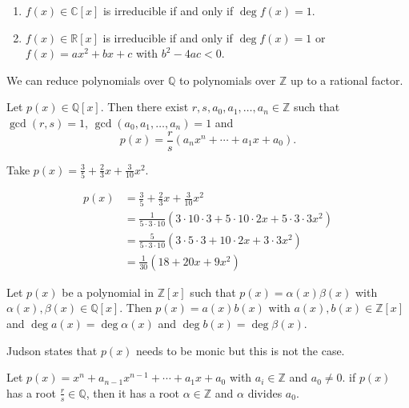 \begin{theorem}\phantom{x}
	\begin{enumerate}
		\item $f(x)\in\mathbb C[x]$ is irreducible if and only if $\deg f(x)=1$.
		\item $f(x)\in\mathbb R[x]$ is irreducible if and only if $\deg f(x)=1$ or $f(x)=ax^2+bx+c$ with $b^2-4ac<0$.
	\end{enumerate}
\end{theorem}

We can reduce polynomials over $\mathbb Q$ to polynomials over $\mathbb Z$ up to a rational factor.

\begin{lemma}
	Let $p(x)\in\mathbb Q[x]$. Then there exist $r,s,a_0,a_1,\hdots,a_n\in\mathbb Z$ such that $\gcd(r,s)=1$, $\gcd(a_0,a_1,\hdots,a_n)=1$ and
	$$p(x)=\frac rs(a_nx^n+\cdots+a_1x+a_0).$$
\end{lemma}

\begin{example}
	Take $p(x)=\frac{3}{5}+\frac 23x+\frac{3}{10}x^2$.

	\begin{align*}
		p(x)&=\frac{3}{5}+\frac 23x+\frac{3}{10}x^2\\
		&=\frac{1}{5\cdot 3\cdot 10}\left(3\cdot 10\cdot 3+5\cdot 10\cdot 2x+5\cdot 3\cdot 3x^2\right)\\
		&=\frac{5}{5\cdot 3\cdot 10}\left(3\cdot 5\cdot 3+10\cdot 2x+3\cdot 3x^2\right)\\
		&=\frac{1}{30}(18+20x+9x^2)
	\end{align*}
\end{example}

\begin{lemma}[Gauss]\label{lem:gauss}
	Let $p(x)$ be a polynomial in $\mathbb Z[x]$ such that $p(x)=\alpha(x)\beta(x)$ with $\alpha(x),\beta(x)\in\mathbb Q[x]$. Then $p(x)=a(x)b(x)$ with $a(x),b(x)\in\mathbb Z[x]$ and $\deg a(x)=\deg\alpha(x)$ and $\deg b(x)=\deg\beta(x)$.
\end{lemma}

\begin{remark}
	Judson states that $p(x)$ needs to be monic but this is not the case.
\end{remark}

\begin{corollary}
	Let $p(x)=x^n+a_{n-1}x^{n-1}+\cdots+a_1x+a_0$ with $a_i\in\mathbb Z$ and $a_0\neq 0$. if $p(x)$ has a root $\frac rs\in \mathbb Q$, then it has a root $\alpha\in\mathbb Z$ and $\alpha$ divides $a_0$.
\end{corollary}

